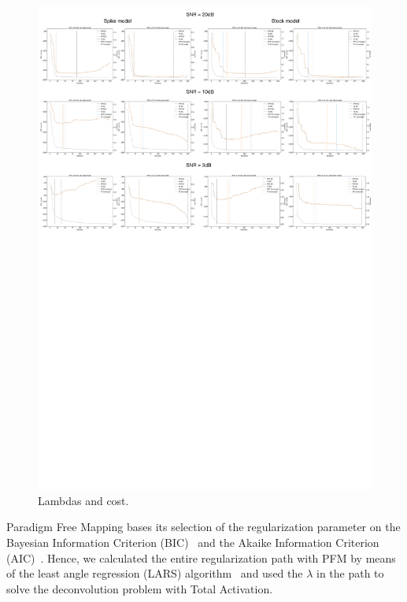 \begin{figure}[t!]
    \begin{center}
        \includegraphics[width=\textwidth]{figures/lambda_cost.pdf}
    \end{center}
    \caption{Lambdas and cost.}
\label{fig:lambdas}
\end{figure}

Paradigm Free Mapping bases its selection of the regularization parameter on the Bayesian Information Criterion (BIC)~\cite{schwarz1978estimating} and the Akaike Information Criterion (AIC)~\cite{akaike1998information}. Hence, we calculated the entire regularization path with PFM by means of the least angle regression (LARS) algorithm~\cite{efron2004least} and used the \(\lambda\) in the path to solve the deconvolution problem with Total Activation.

